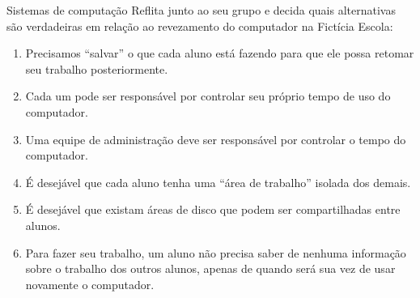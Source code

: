 \documentclass{beamer}
\begin{document}
\begin{frame}[fragile]{Sistemas de computação}
  \centering
  \large
  Reflita junto ao seu grupo e decida quais alternativas são verdadeiras em
  relação ao revezamento do computador na Fictícia Escola:
  \begin{enumerate}
    \item Precisamos ``salvar'' o que cada aluno está fazendo para que ele
      possa retomar seu trabalho posteriormente.
    \item Cada um pode ser responsável por controlar seu próprio tempo de uso
      do computador.
    \item Uma equipe de administração deve ser responsável por controlar o tempo
      do computador.
    \item É desejável que cada aluno tenha uma ``área de trabalho''
      isolada dos demais.
    \item É desejável que existam áreas de disco que podem ser compartilhadas
      entre alunos.
    \item Para fazer seu trabalho, um aluno não precisa saber de nenhuma
      informação sobre o trabalho dos outros alunos, apenas de quando será sua
      vez de usar novamente o computador.
  \end{enumerate}

\end{frame}
\end{document}
